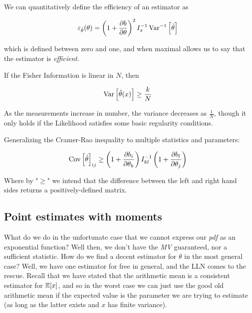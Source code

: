  We can quantitatively define the efficiency of an estimator as
 
	\[
	\varepsilon_{\hat\theta}(\theta) = \left(1+\frac{\partial b}{\partial \theta}\right)^2 I_x^{-1}\operatorname{Var}^{-1}\left[\hat\theta\right]
	\]

which is defined between zero and one, and when maximal allows us to say that the estimator is \emph{efficient}.

\begin{corollary}
	If the Fisher Information is linear in $N$, then
	
	\[
	\operatorname{Var}\left[\hat\theta(x)\right] \geq \frac{k}{N}
	\]
	
	As the measurements increase in number, the variance decreases as $\frac{1}{N}$, though it only holds if the Likelihood satisfies some basic regularity conditions.
\end{corollary}

Generalizing the Cramer-Rao inequality to multiple statistics and parameters:

	\[
	\operatorname{Cov}\left[\hat\theta\right]_{ij}\geq\left(1+\frac{\partial b_i}{\partial \theta_k}\right)I^{-1}_{kl}\left(1+\frac{\partial b_l}{\partial \theta_j}\right)
	\]
	
Where by "$\geq$" we intend that the difference between the left and right hand sides returns a positively-defined matrix.


\subsection{Point estimates with moments}

What do we do in the unfortunate case that we cannot express our \emph{pdf} as an exponential function? Well then, we don't have the \emph{MV} guaranteed, nor a sufficient statistic. How do we find a decent estimator for $\theta$ in the most general case? Well, we have one estimator for free in general, and the LLN comes to the rescue. Recall that we have stated that the arithmetic mean is a consistent estimator for $\mathbb{E}[x]$, and so in the worst case we can just use the good old arithmetic mean if the expected value is the parameter we are trying to estimate (as long as the latter exists and $x$ has finite variance). 

